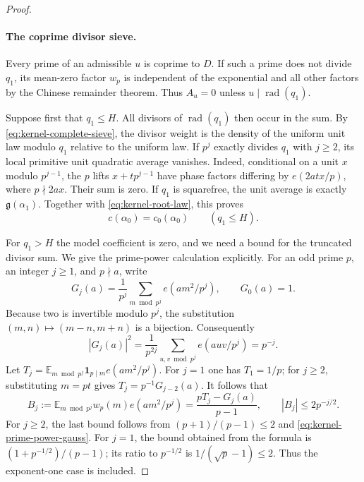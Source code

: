 \begin{proof}
\paragraph{The coprime divisor sieve.}
Every prime of an admissible $u$ is coprime to $D$.
If such a prime does not divide $q_1$, its mean-zero factor $w_p$
is independent of the exponential and all other factors by the
Chinese remainder theorem. Thus $A_u=0$ unless
$u\mid\operatorname{rad}(q_1)$.

Suppose first that $q_1\le H$. All divisors of
$\operatorname{rad}(q_1)$ then occur in the sum. By
\eqref{eq:kernel-complete-sieve}, the divisor weight is the density of
the uniform unit law modulo $q_1$ relative to the uniform law.
If $p^j$ exactly divides $q_1$ with
$j\ge2$, its local primitive unit quadratic average vanishes.
Indeed, conditional on a unit $x$ modulo $p^{j-1}$, the $p$ lifts
$x+tp^{j-1}$ have phase factors differing by $e(2atx/p)$,
where $p\nmid 2ax$. Their sum is zero.
If $q_1$ is squarefree, the unit average is exactly
$\mathfrak g(\alpha_1)$.
Together with \eqref{eq:kernel-root-law}, this proves
\begin{equation}
 c(\alpha_0)=c_0(\alpha_0)\qquad(q_1\le H).
 \label{eq:kernel-small-coefficient}
\end{equation}

For $q_1>H$ the model coefficient is zero, and we need a bound for
the truncated divisor sum. We give the prime-power calculation
explicitly. For an odd prime $p$, an integer $j\ge1$, and $p\nmid a$,
write
\[
 G_j(a)=\frac1{p^j}\sum_{m\bmod p^j}e(am^2/p^j),
 \qquad G_0(a)=1.
\]
Because two is invertible modulo $p^j$, the substitution
$(m,n)\mapsto(m-n,m+n)$ is a bijection. Consequently
\begin{equation}
 |G_j(a)|^2
 =\frac1{p^{2j}}\sum_{u,v\bmod p^j}e(auv/p^j)
 =p^{-j}.
 \label{eq:kernel-prime-power-gauss}
\end{equation}
Let
$T_j=\mathbb E_{m\bmod p^j}\mathbf1_{p\mid m}e(am^2/p^j)$.
For $j=1$ one has $T_1=1/p$; for $j\ge2$, substituting $m=pt$
gives $T_j=p^{-1}G_{j-2}(a)$.
It follows that
\begin{equation}
 B_j:=\mathbb E_{m\bmod p^j}w_p(m)e(am^2/p^j)
      =\frac{pT_j-G_j(a)}{p-1},
 \qquad |B_j|\le2p^{-j/2}.
 \label{eq:kernel-weighted-prime-power-gauss}
\end{equation}
For $j\ge2$, the last bound follows from
$(p+1)/(p-1)\le2$ and \eqref{eq:kernel-prime-power-gauss}.
For $j=1$, the bound obtained from the formula is
$(1+p^{-1/2})/(p-1)$; its ratio to $p^{-1/2}$ is
$1/(\sqrt p-1)\le2$. Thus the exponent-one case is included.


\end{proof}
